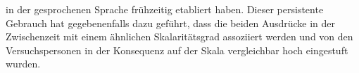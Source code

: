 in der gesprochenen Sprache frühzeitig etabliert haben. Dieser persistente Gebrauch hat gegebenenfalls dazu geführt, dass die beiden Ausdrücke in der Zwischenzeit mit einem ähnlichen Skalaritätsgrad assoziiert werden und von den Versuchspersonen in der Konsequenz auf der Skala vergleichbar hoch {eingestuft wurden}.



















